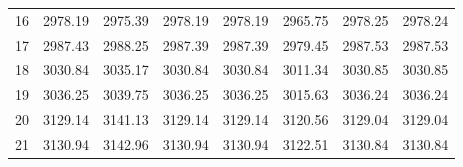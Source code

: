 \documentclass[10pt,oneside]{article}
\begin{document}
\begin{table}[h!]
\begin{tabular}{cccccccc}
16 &   2978.19 & 2975.39 & 2978.19 & 2978.19 &      2965.75 & 2978.25 & 2978.24 \\
17 &   2987.43 & 2988.25 & 2987.39 & 2987.39 &      2979.45 & 2987.53 & 2987.53 \\
18 &   3030.84 & 3035.17 & 3030.84 & 3030.84 &      3011.34 & 3030.85 & 3030.85 \\
19 &   3036.25 & 3039.75 & 3036.25 & 3036.25 &      3015.63 & 3036.24 & 3036.24 \\
20 &   3129.14 & 3141.13 & 3129.14 & 3129.14 &      3120.56 & 3129.04 & 3129.04 \\
21 &   3130.94 & 3142.96 & 3130.94 & 3130.94 &      3122.51 & 3130.84 & 3130.84 \\
\bottomrule
\end{tabular}
\end{table}

\clearpage
\end{document}
